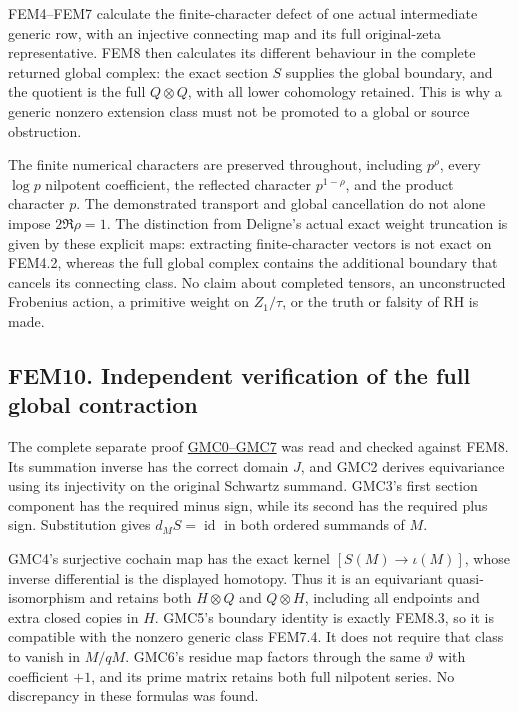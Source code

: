 FEM4--FEM7 calculate the finite-character defect of one actual
intermediate generic row, with an injective connecting map and its full
original-zeta representative. FEM8 then calculates its different
behaviour in the complete returned global complex: the exact section
\(S\) supplies the global boundary, and the quotient is the full
\(Q\otimes Q\), with all lower cohomology retained. This is why a
generic nonzero extension class must not be promoted to a global or
source obstruction.

The finite numerical characters are preserved throughout, including
\(p^\rho\), every \(\log p\) nilpotent coefficient, the reflected
character \(p^{1-\rho}\), and the product character \(p\). The
demonstrated transport and global cancellation do not alone impose
\(2\Re\rho=1\). The distinction from Deligne's actual exact weight
truncation is given by these explicit maps: extracting finite-character
vectors is not exact on FEM4.2, whereas the full global complex contains
the additional boundary that cancels its connecting class. No claim
about completed tensors, an unconstructed Frobenius action, a primitive
weight on \(Z_1/\tau\), or the truth or falsity of RH is made.

\subsection{FEM10. Independent verification of the full global
contraction}\label{fem10.-independent-verification-of-the-full-global-contraction}

The complete separate proof
\href{https://github.com/KokunoYumeto/zeta-function-research-reader/blob/main/workbenches/splitzero-tandem/continuations/20260925-full-source-tensor-and-original-divisor/counterfactual/GLOBAL_MIXED_RETURN_CONTRACTION.md}{GMC0--GMC7}
was read and checked against FEM8. Its summation inverse has the correct
domain \(J\), and GMC2 derives equivariance using its injectivity on the
original Schwartz summand. GMC3's first section component has the
required minus sign, while its second has the required plus sign.
Substitution gives \(d_MS=\operatorname{id}\) in both ordered summands
of \(M\).

GMC4's surjective cochain map has the exact kernel
\([S(M)\to\iota(M)]\), whose inverse differential is the displayed
homotopy. Thus it is an equivariant quasi-isomorphism and retains both
\(H\otimes Q\) and \(Q\otimes H\), including all endpoints and extra
closed copies in \(H\). GMC5's boundary identity is exactly FEM8.3, so
it is compatible with the nonzero generic class FEM7.4. It does not
require that class to vanish in \(M/qM\). GMC6's residue map factors
through the same \(\vartheta\) with coefficient \(+1\), and its prime
matrix retains both full nilpotent series. No discrepancy in these
formulas was found.

